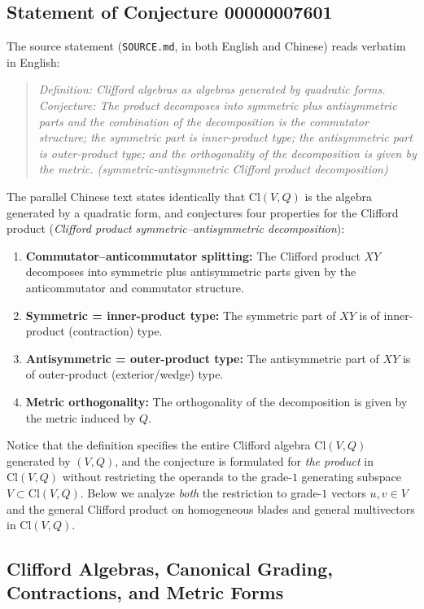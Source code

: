 \documentclass[11pt]{article}
\theoremstyle{plain}
\theoremstyle{definition}
\theoremstyle{remark}
\newcommand{\Cl}{\mathrm{Cl}}
\begin{document}
\subsection{Statement of Conjecture 00000007601}

The source statement (\texttt{SOURCE.md}, in both English and Chinese) reads verbatim in English:
\begin{quote}
\emph{Definition: Clifford algebras as algebras generated by quadratic forms. Conjecture: The product decomposes into symmetric plus antisymmetric parts and the combination of the decomposition is the commutator structure; the symmetric part is inner-product type; the antisymmetric part is outer-product type; and the orthogonality of the decomposition is given by the metric. (symmetric-antisymmetric Clifford product decomposition)}
\end{quote}
The parallel Chinese text states identically that $\Cl(V, Q)$ is the algebra generated by a quadratic form, and conjectures four properties for the Clifford product (\emph{Clifford product symmetric--antisymmetric decomposition}):
\begin{enumerate}
  \item[\textbf{(C1)}] \textbf{Commutator--anticommutator splitting:} The Clifford product $X Y$ decomposes into symmetric plus antisymmetric parts given by the anticommutator and commutator structure.
  \item[\textbf{(C2)}] \textbf{Symmetric = inner-product type:} The symmetric part of $X Y$ is of inner-product (contraction) type.
  \item[\textbf{(C3)}] \textbf{Antisymmetric = outer-product type:} The antisymmetric part of $X Y$ is of outer-product (exterior/wedge) type.
  \item[\textbf{(C4)}] \textbf{Metric orthogonality:} The orthogonality of the decomposition is given by the metric induced by $Q$.
\end{enumerate}

Notice that the definition specifies the entire Clifford algebra $\Cl(V, Q)$ generated by $(V, Q)$, and the conjecture is formulated for \emph{the product} in $\Cl(V, Q)$ without restricting the operands to the grade-$1$ generating subspace $V \subset \Cl(V, Q)$. Below we analyze \emph{both} the restriction to grade-$1$ vectors $u, v \in V$ and the general Clifford product on homogeneous blades and general multivectors in $\Cl(V, Q)$.

\subsection{Clifford Algebras, Canonical Grading, Contractions, and Metric Forms}
\end{document}
